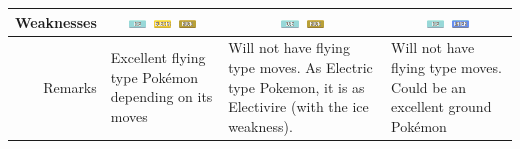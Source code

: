 \documentclass[12pt]{beamer}
\newcommand{\electricfull}{\includegraphics[height=0.2cm]{../../images/type/full/Electric.png}}
\newcommand{\icefull}{\includegraphics[height=0.2cm]{../../images/type/full/Ice.png}}
\newcommand{\rockfull}{\includegraphics[height=0.2cm]{../../images/type/full/Rock.png}}
\newcommand{\waterfull}{\includegraphics[height=0.2cm]{../../images/type/full/Water.png}}
\begin{document}
\begin{frame}
\begin{block}{}
\begin{footnotesize}
\begin{center}
\begin{tabular}{rp{3cm}p{3cm}p{3cm}}
Weaknesses & \multicolumn{1}{c}{\icefull~\electricfull~\rockfull} & \multicolumn{1}{c}{\icefull~\rockfull}  & \multicolumn{1}{c}{\icefull~\waterfull} \\ \hline
Remarks &  Excellent flying type Pokémon depending on its moves & Will not have flying type moves. As Electric type Pokemon, it is as Electivire (with the ice weakness). &  Will not have flying type moves.  Could be an excellent ground Pokémon \\
\end{tabular}
\end{center}
\end{footnotesize}
\end{block}
\end{frame}
\end{document}
